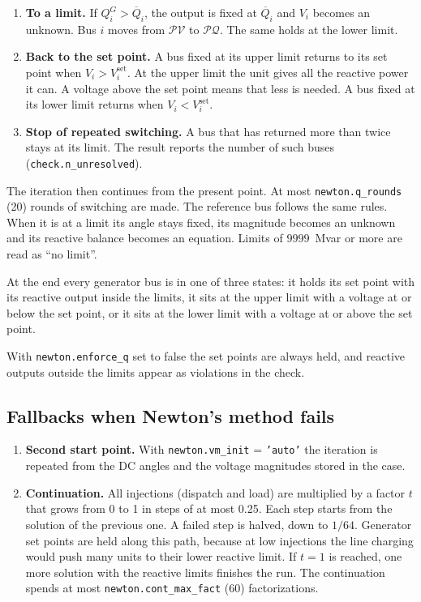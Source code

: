 \documentclass[a4paper,11pt]{article}
\newcommand{\opt}[1]{\texttt{#1}}
\begin{document}
\begin{enumerate}[nosep]
  \item \textbf{To a limit.} If $Q^G_i > \overline{Q}_i$, the output is fixed at $\overline{Q}_i$ and $V_i$ becomes an unknown. Bus $i$ moves from $\mathcal{PV}$ to $\mathcal{PQ}$. The same holds at the lower limit.
  \item \textbf{Back to the set point.} A bus fixed at its upper limit returns to its set point when $V_i > V^{\mathrm{set}}_i$. At the upper limit the unit gives all the reactive power it can. A voltage above the set point means that less is needed. A bus fixed at its lower limit returns when $V_i < V^{\mathrm{set}}_i$.
  \item \textbf{Stop of repeated switching.} A bus that has returned more than twice stays at its limit. The result reports the number of such buses (\texttt{check.n\_unresolved}).
\end{enumerate}

The iteration then continues from the present point. At most \opt{newton.q\_rounds} (20) rounds of switching are made. The reference bus follows the same rules. When it is at a limit its angle stays fixed, its magnitude becomes an unknown and its reactive balance becomes an equation. Limits of $9999$~Mvar or more are read as ``no limit''.

At the end every generator bus is in one of three states: it holds its set point with its reactive output inside the limits, it sits at the upper limit with a voltage at or below the set point, or it sits at the lower limit with a voltage at or above the set point.

With \opt{newton.enforce\_q} set to false the set points are always held, and reactive outputs outside the limits appear as violations in the check.

\subsection{Fallbacks when Newton's method fails}\label{sec:fallback}

\begin{enumerate}[nosep]
  \item \textbf{Second start point.} With \opt{newton.vm\_init} = \texttt{'auto'} the iteration is repeated from the DC angles and the voltage magnitudes stored in the case.
  \item \textbf{Continuation.} All injections (dispatch and load) are multiplied by a factor $t$ that grows from 0 to 1 in steps of at most 0.25. Each step starts from the solution of the previous one. A failed step is halved, down to $1/64$. Generator set points are held along this path, because at low injections the line charging would push many units to their lower reactive limit. If $t=1$ is reached, one more solution with the reactive limits finishes the run. The continuation spends at most \opt{newton.cont\_max\_fact} (60) factorizations.
\end{enumerate}
\end{document}
